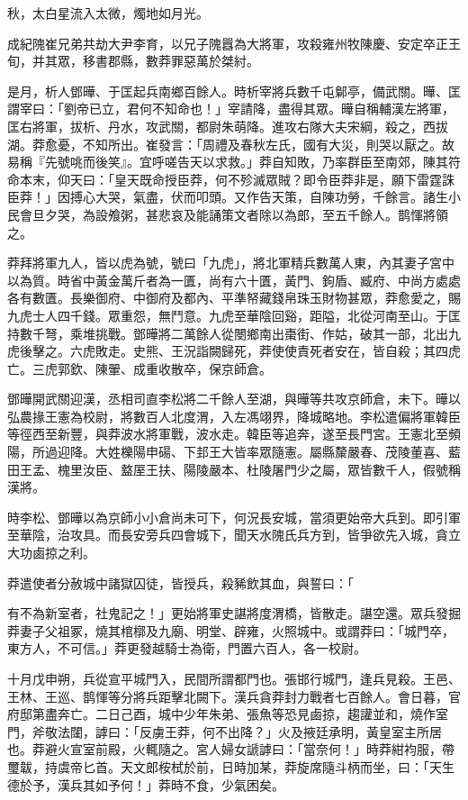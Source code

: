 \begin{pinyinscope}
秋，太白星流入太微，燭地如月光。

成紀隗崔兄弟共劫大尹李育，以兄子隗囂為大將軍，攻殺雍州牧陳慶、安定卒正王旬，并其眾，移書郡縣，數莽罪惡萬於桀紂。

是月，析人鄧曄、于匡起兵南鄉百餘人。時析宰將兵數千屯鄡亭，備武關。曄、匡謂宰曰：「劉帝已立，君何不知命也！」宰請降，盡得其眾。曄自稱輔漢左將軍，匡右將軍，拔析、丹水，攻武關，都尉朱萌降。進攻右隊大夫宋綱，殺之，西拔湖。莽愈憂，不知所出。崔發言：「周禮及春秋左氏，國有大災，則哭以厭之。故易稱『先號咷而後笑』。宜呼嗟告天以求救。」莽自知敗，乃率群臣至南郊，陳其符命本末，仰天曰：「皇天既命授臣莽，何不殄滅眾賊？即令臣莽非是，願下雷霆誅臣莽！」因搏心大哭，氣盡，伏而叩頭。又作告天策，自陳功勞，千餘言。諸生小民會旦夕哭，為設飧粥，甚悲哀及能誦策文者除以為郎，至五千餘人。鹊惲將領之。

莽拜將軍九人，皆以虎為號，號曰「九虎」，將北軍精兵數萬人東，內其妻子宮中以為質。時省中黃金萬斤者為一匱，尚有六十匱，黃門、鉤盾、臧府、中尚方處處各有數匱。長樂御府、中御府及都內、平準帑藏錢帛珠玉財物甚眾，莽愈愛之，賜九虎士人四千錢。眾重怨，無鬥意。九虎至華陰回谿，距隘，北從河南至山。于匡持數千弩，乘堆挑戰。鄧曄將二萬餘人從閿鄉南出棗街、作姑，破其一部，北出九虎後擊之。六虎敗走。史熊、王況詣闕歸死，莽使使責死者安在，皆自殺；其四虎亡。三虎郭欽、陳翬、成重收散卒，保京師倉。

鄧曄開武關迎漢，丞相司直李松將二千餘人至湖，與曄等共攻京師倉，未下。曄以弘農掾王憲為校尉，將數百人北度渭，入左馮翊界，降城略地。李松遣偏將軍韓臣等徑西至新豐，與莽波水將軍戰，波水走。韓臣等追奔，遂至長門宮。王憲北至頻陽，所過迎降。大姓櫟陽申碭、下邽王大皆率眾隨憲。屬縣斄嚴春、茂陵董喜、藍田王孟、槐里汝臣、盩厔王扶、陽陵嚴本、杜陵屠門少之屬，眾皆數千人，假號稱漢將。

時李松、鄧曄以為京師小小倉尚未可下，何況長安城，當須更始帝大兵到。即引軍至華陰，治攻具。而長安旁兵四會城下，聞天水隗氏兵方到，皆爭欲先入城，貪立大功鹵掠之利。

莽遣使者分赦城中諸獄囚徒，皆授兵，殺豨飲其血，與誓曰：「

有不為新室者，社鬼記之！」更始將軍史諶將度渭橋，皆散走。諶空還。眾兵發掘莽妻子父祖冢，燒其棺槨及九廟、明堂、辟雍，火照城中。或謂莽曰：「城門卒，東方人，不可信。」莽更發越騎士為衛，門置六百人，各一校尉。

十月戊申朔，兵從宣平城門入，民間所謂都門也。張邯行城門，逢兵見殺。王邑、王林、王巡、鹊惲等分將兵距擊北闕下。漢兵貪莽封力戰者七百餘人。會日暮，官府邸第盡奔亡。二日己酉，城中少年朱弟、張魚等恐見鹵掠，趨讙並和，燒作室門，斧敬法闥，謼曰：「反虜王莽，何不出降？」火及掖廷承明，黃皇室主所居也。莽避火宣室前殿，火輒隨之。宮人婦女謕謼曰：「當奈何！」時莽紺袀服，帶璽韍，持虞帝匕首。天文郎桉栻於前，日時加某，莽旋席隨斗柄而坐，曰：「天生德於予，漢兵其如予何！」莽時不食，少氣困矣。


\end{pinyinscope}
